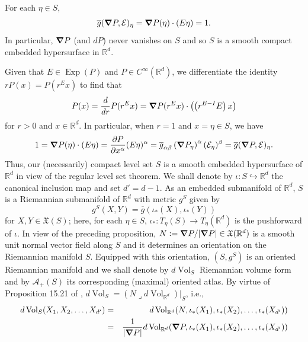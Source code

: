 \documentclass[smallextended]{svjour3}
\theoremstyle{remark}
\renewenvironment{proof}[1][\proofname]{\renewcommand\xproofname{#1}\xproof}{\endxproof}
\newcommand\Exp{\operatorname{Exp}}
\newcommand{\Vol}{\operatorname{Vol}}
\newcommand{\iprod}{\mathbin{\lrcorner}}
\begin{document}
\begin{proposition}\label{prop:InnerProdIsOne}
For each $\eta\in S$, 
\begin{equation*}
    \overline{g}(\grad P,\mathcal{E})_{\eta}=\grad P(\eta)\cdot (E\eta)=1.
\end{equation*}
In particular, $\grad P$ (and $dP$) never vanishes on $S$ and so $S$ is a smooth compact embedded hypersurface in $\mathbb{R}^d$.
\end{proposition}
\begin{proof}
Given that $E\in\Exp(P)$ and $P\in C^\infty(\mathbb{R}^d)$, we differentiate the identity $rP(x)=P(r^Ex)$ to find that
\begin{equation*}
    P(x)=\frac{d}{dr}P(r^Ex)=\grad P(r^Ex)\cdot\left(\left(r^{E-I}E\right)x\right)
\end{equation*}
for $r>0$ and $x\in\mathbb{R}^d$. In particular, when $r=1$ and $x=\eta\in S$, we have
\begin{equation*}
    1=\grad P(\eta)\cdot \left(E\eta\right)=\frac{\partial P}{\partial x^\alpha}(E\eta)^\alpha=\overline{g}_{\alpha \beta}\left(\grad P_\eta\right)^{\alpha}(\mathcal{E}_\eta)^\beta=\overline{g}(\grad P,\mathcal{E})_\eta.
\end{equation*}
Thus, our (necessarily) compact level set $S$ is a smooth embedded hypersurface of $\mathbb{R}^d$ in view of the regular level set theorem.
\end{proof}
\noindent We shall denote by $\iota:  S \hookrightarrow \mathbb{R}^d$ the canonical inclusion map and set $d'=d-1$. As an embedded submanifold of $\mathbb{R}^d$, $S$ is a Riemannian submanifold of $\mathbb{R}^d$ with metric $g^S$ given by
\begin{equation*}
    g^S(X,Y)=\overline{g}(\iota_*(X),\iota_*(Y))
\end{equation*}
for $X,Y\in\mathfrak{X}(S)$; here, for each $\eta\in S$,  $\iota_*:T_\eta(S)\to T_\eta(\mathbb{R}^d)$ is the pushforward of $\iota$.  In view of the preceding proposition, $N:=\grad P/|\grad P|\in \mathfrak{X}(\mathbb{R}^d)$ is a smooth unit normal vector field along $S$ and it determines an orientation on the Riemannian manifold $S$. Equipped with this orientation, $(S,g^S)$ is an oriented Riemannian manifold and we shall denote by $d\Vol_S$ Riemannian volume form and by $\mathcal{A}_+(S)$ its corresponding (maximal) oriented atlas. By virtue of Proposition 15.21 of \cite{lee_introduction_2003}, $d\Vol_S=(N\iprod d\Vol_{\mathbb{R}^d})\vert_S$, i.e.,
\begin{eqnarray*}
    d\Vol_S(X_1,X_2,\dots,X_{d'})&=&d\Vol_{\mathbb{R}^d}(N,\iota_*(X_1),\iota_*(X_2),\dots,\iota_*(X_{d'}))\\
    &=&\frac{1}{|\grad P|}d\Vol_{\mathbb{R}^d}(\grad P,\iota_*(X_1),\iota_*(X_2),\dots,\iota_*(X_{d'}))
\end{eqnarray*}
\end{document}
